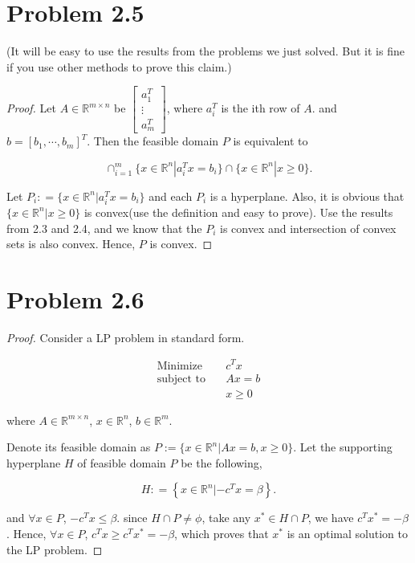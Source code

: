 \documentclass[12pt]{article}
\begin{document}
\section*{Problem 2.5}

(It will be easy to use the results from the problems we just solved. But it is fine if you use other methods to prove this claim.)

\begin{proof}

Let $A \in \mathbb{R}^{m\times n}$ be $\begin{bmatrix}
a_1^T \\
\vdots \\
a_m^T
\end{bmatrix}
$, where $a_i^T$ is the ith row of $A$. 
and $b = [b_1, \cdots, b_m]^T$. Then the feasible domain $P$ is equivalent to 

$$
\cap_{i=1}^m \{ x\in\mathbb{R}^n | a_i^T x = b_i  \} \cap \{x\in\mathbb{R}^n | x \geqslant 0\}.
$$

Let $P_i : = \{ x\in\mathbb{R}^n | a_i^T x = b_i  \}$ and each $P_i$ is a hyperplane. Also, it is obvious that $\{x\in\mathbb{R}^n | x \geqslant 0\}$ is convex(use the definition and easy to prove). Use the results from 2.3 and 2.4, and we know that the $P_i$ is convex and intersection of convex sets is also convex. Hence, $P$ is convex.

\end{proof}

\section*{Problem 2.6}

\begin{proof}

Consider a LP problem in standard form. 

\begin{equation*}
\begin{aligned}
\text{Minimize} \quad & c^Tx \\
\text{subject\  to} \quad & Ax = b \\
 & x \geqslant 0
\end{aligned}
\end{equation*}

where $A \in \mathbb{R}^{m\times n}$, $x\in \mathbb{R}^n$, $b \in \mathbb{R}^m$.

Denote its feasible domain as $P := \{x \in \mathbb{R}^n | Ax = b, x \geqslant 0 \}$. Let the supporting hyperplane $H$ of feasible domain $P$ be the following,

$$
H: = \left\{  x\in\mathbb{R}^n| -c^Tx = \beta \right\}.
$$

and $\forall x\in P$, $-c^Tx \leqslant \beta$. since $H\cap P \neq \phi$, take any $x^* \in H\cap P$, we have $c^Tx^* =  -\beta$. Hence, $\forall x\in P$, $c^Tx \geqslant c^Tx^* = -\beta$, which proves that $x^*$ is an optimal solution to the LP problem.

\end{proof}
\end{document}
